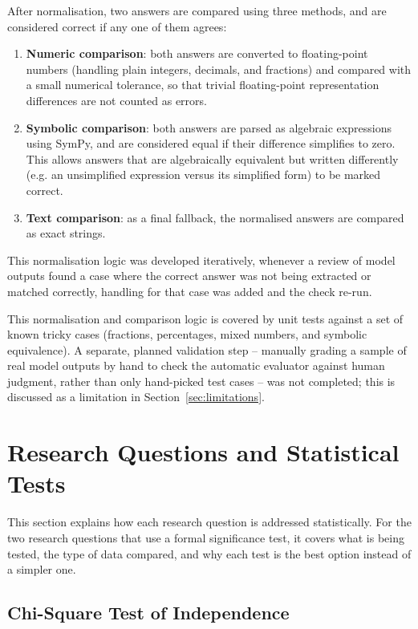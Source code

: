 After normalisation, two answers are compared using three methods, and
are considered correct if any one of them agrees:

\begin{enumerate}
  \item \textbf{Numeric comparison}: both answers are converted to
  floating-point numbers (handling plain integers, decimals, and
  fractions) and compared with a small numerical tolerance, so that
  trivial floating-point representation differences are not counted as
  errors.
  \item \textbf{Symbolic comparison}: both answers are parsed as
  algebraic expressions using SymPy, and are considered equal if their
  difference simplifies to zero. This allows answers that are
  algebraically equivalent but written differently (e.g. an unsimplified
  expression versus its simplified form) to be marked correct.
  \item \textbf{Text comparison}: as a final fallback, the normalised
  answers are compared as exact strings.
\end{enumerate}

This normalisation logic was developed iteratively, whenever a review of
model outputs found a case where the correct answer was not being
extracted or matched correctly, handling for that case was added and the
check re-run.

This normalisation and comparison logic is covered by unit tests against
a set of known tricky cases (fractions, percentages, mixed numbers, and
symbolic equivalence). A separate, planned validation step -- manually
grading a sample of real model outputs by hand to check the automatic
evaluator against human judgment, rather than only hand-picked test
cases -- was not completed; this is discussed as a limitation in
Section~\ref{sec:limitations}.

\section{Research Questions and Statistical Tests}

This section explains how each research question is addressed
statistically. For the two research questions that use a formal
significance test, it covers what is being tested, the type of data
compared, and why each test is the best option instead of a simpler one.

\subsection{Chi-Square Test of Independence}

